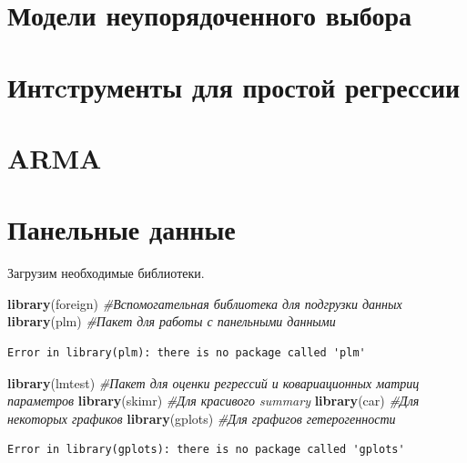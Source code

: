 \documentclass[]{book}
\newenvironment{Shaded}{\begin{snugshade}}{\end{snugshade}}
\newcommand{\CommentTok}[1]{\textcolor[rgb]{0.56,0.35,0.01}{\textit{#1}}}
\newcommand{\KeywordTok}[1]{\textcolor[rgb]{0.13,0.29,0.53}{\textbf{#1}}}
\newcommand{\NormalTok}[1]{#1}
\begin{document}
\hypertarget{disordered}{%
\chapter{Модели неупорядоченного выбора}\label{disordered}}

\hypertarget{instruments}{%
\chapter{Интcтрументы для простой регрессии}\label{instruments}}

\hypertarget{arma}{%
\chapter{ARMA}\label{arma}}

\hypertarget{paneldata}{%
\chapter{Панельные данные}\label{paneldata}}

Загрузим необходимые библиотеки.

\begin{Shaded}
\begin{Highlighting}[]
\KeywordTok{library}\NormalTok{(foreign) }\CommentTok{#Вспомогательная библиотека для подгрузки данных}
\KeywordTok{library}\NormalTok{(plm) }\CommentTok{#Пакет для работы с панельными данными}
\end{Highlighting}
\end{Shaded}

\begin{verbatim}
Error in library(plm): there is no package called 'plm'
\end{verbatim}

\begin{Shaded}
\begin{Highlighting}[]
\KeywordTok{library}\NormalTok{(lmtest) }\CommentTok{#Пакет для оценки регрессий и ковариационных матриц параметров}
\KeywordTok{library}\NormalTok{(skimr) }\CommentTok{#Для красивого summary}
\KeywordTok{library}\NormalTok{(car) }\CommentTok{#Для некоторых графиков}
\KeywordTok{library}\NormalTok{(gplots) }\CommentTok{#Для графигов гетерогенности}
\end{Highlighting}
\end{Shaded}

\begin{verbatim}
Error in library(gplots): there is no package called 'gplots'
\end{verbatim}
\end{document}
